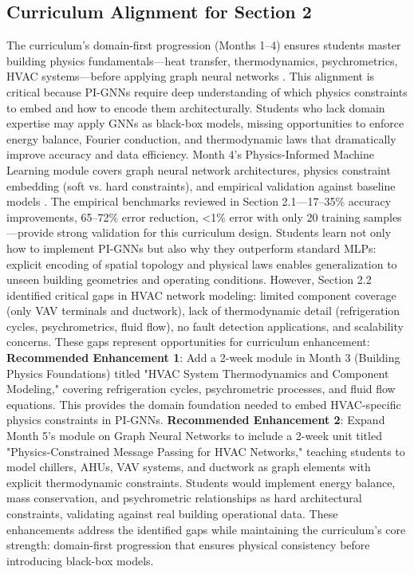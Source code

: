 \documentclass[12pt,a4paper]{article}
\begin{document}
\subsection{Curriculum Alignment for Section 2}
The curriculum's domain-first progression (Months 1--4) ensures students master building physics fundamentals---heat transfer, thermodynamics, psychrometrics, HVAC systems---before applying graph neural networks \cite{ref170}. This alignment is critical because PI-GNNs require deep understanding of which physics constraints to embed and how to encode them architecturally. Students who lack domain expertise may apply GNNs as black-box models, missing opportunities to enforce energy balance, Fourier conduction, and thermodynamic laws that dramatically improve accuracy and data efficiency.
Month 4's Physics-Informed Machine Learning module covers graph neural network architectures, physics constraint embedding (soft vs. hard constraints), and empirical validation against baseline models \cite{ref170}. The empirical benchmarks reviewed in Section 2.1---17--35\% accuracy improvements, 65--72\% error reduction, <1\% error with only 20 training samples---provide strong validation for this curriculum design. Students learn not only how to implement PI-GNNs but also why they outperform standard MLPs: explicit encoding of spatial topology and physical laws enables generalization to unseen building geometries and operating conditions.
However, Section 2.2 identified critical gaps in HVAC network modeling: limited component coverage (only VAV terminals and ductwork), lack of thermodynamic detail (refrigeration cycles, psychrometrics, fluid flow), no fault detection applications, and scalability concerns. These gaps represent opportunities for curriculum enhancement:
\textbf{Recommended Enhancement 1}: Add a 2-week module in Month 3 (Building Physics Foundations) titled "HVAC System Thermodynamics and Component Modeling," covering refrigeration cycles, psychrometric processes, and fluid flow equations. This provides the domain foundation needed to embed HVAC-specific physics constraints in PI-GNNs.
\textbf{Recommended Enhancement 2}: Expand Month 5's module on Graph Neural Networks to include a 2-week unit titled "Physics-Constrained Message Passing for HVAC Networks," teaching students to model chillers, AHUs, VAV systems, and ductwork as graph elements with explicit thermodynamic constraints. Students would implement energy balance, mass conservation, and psychrometric relationships as hard architectural constraints, validating against real building operational data.
These enhancements address the identified gaps while maintaining the curriculum's core strength: domain-first progression that ensures physical consistency before introducing black-box models.
\end{document}
